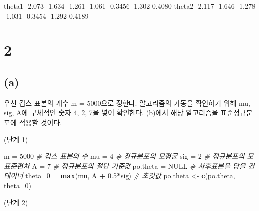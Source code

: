 \documentclass[
]{article}
\newenvironment{Shaded}{\begin{snugshade}}{\end{snugshade}}
\newcommand{\CommentTok}[1]{\textcolor[rgb]{0.56,0.35,0.01}{\textit{#1}}}
\newcommand{\ConstantTok}[1]{\textcolor[rgb]{0.56,0.35,0.01}{#1}}
\newcommand{\DecValTok}[1]{\textcolor[rgb]{0.00,0.00,0.81}{#1}}
\newcommand{\FloatTok}[1]{\textcolor[rgb]{0.00,0.00,0.81}{#1}}
\newcommand{\FunctionTok}[1]{\textcolor[rgb]{0.13,0.29,0.53}{\textbf{#1}}}
\newcommand{\NormalTok}[1]{#1}
\newcommand{\OtherTok}[1]{\textcolor[rgb]{0.56,0.35,0.01}{#1}}
\newcommand{\SpecialCharTok}[1]{\textcolor[rgb]{0.81,0.36,0.00}{\textbf{#1}}}
\begin{document}
theta1 -2.073 -1.634 -1.261 -1.061 -0.3456 -1.302 0.4080 theta2 -2.117
-1.646 -1.278 -1.031 -0.3454 -1.292 0.4189

\section{2}\label{section-2}

\subsection{(a)}\label{a-2}

우선 깁스 표본의 개수 m = 5000으로 정한다. 알고리즘의 가동을 확인하기
위해 mu, sig, A에 구체적인 숫자 4, 2, 7을 넣어 확인한다. (b)에서 해당
알고리즘을 표준정규분포에 적용할 것이다.

(단계 1)

\begin{Shaded}
\begin{Highlighting}[]
\NormalTok{m }\OtherTok{=} \DecValTok{5000} \CommentTok{\# 깁스 표본의 수}
\NormalTok{mu }\OtherTok{=} \DecValTok{4} \CommentTok{\# 정규분포의 모평균}
\NormalTok{sig }\OtherTok{=} \DecValTok{2} \CommentTok{\# 정규분포의 모표준편차}
\NormalTok{A }\OtherTok{=} \DecValTok{7} \CommentTok{\# 정규분포의 절단 기준값}
\NormalTok{po.theta }\OtherTok{=} \ConstantTok{NULL} \CommentTok{\# 사후표본을 담을 컨테이너}
\NormalTok{theta\_0 }\OtherTok{=} \FunctionTok{max}\NormalTok{(mu, A }\SpecialCharTok{+} \FloatTok{0.5}\SpecialCharTok{*}\NormalTok{sig) }\CommentTok{\# 초깃값}
\NormalTok{po.theta }\OtherTok{\textless{}{-}} \FunctionTok{c}\NormalTok{(po.theta, theta\_0)}
\end{Highlighting}
\end{Shaded}

(단계 2)
\end{document}
